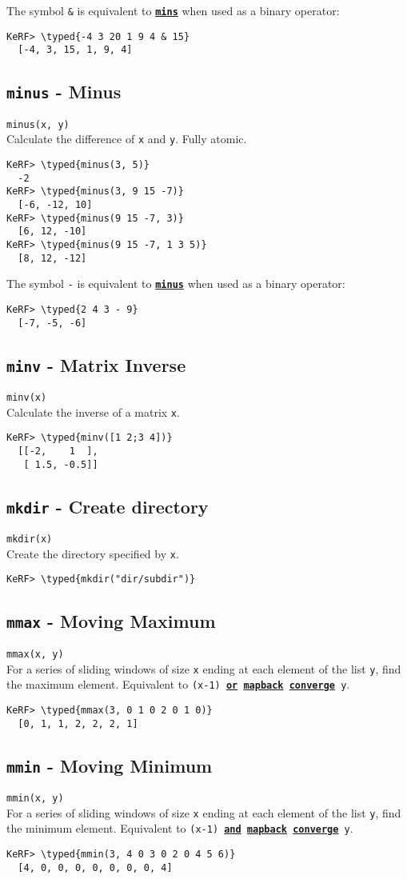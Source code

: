 \documentclass{article}
\newcommand{\typed}[1]{\textcolor{TealBlue}{#1}}
\newcommand{\primdefu}[3]{\subsection{\texttt{#1} - #2}\label{prim:#3}}
\newcommand{\primu}[2]{\hyperref[prim:#2]{\textbf{\texttt{#1}}}}
\newcommand{\primdef}[2]{\primdefu{#1}{#2}{#1}}
\newcommand{\prim}[1]{\primu{#1}{#1}}
\newcommand{\comb}[1]{\primu{#1}{#1}}
\begin{document}
The symbol \texttt{\&} is equivalent to \prim{mins} when used as a binary operator:
\begin{Verbatim}
KeRF> \typed{-4 3 20 1 9 4 & 15}
  [-4, 3, 15, 1, 9, 4]
\end{Verbatim}

\primdef{minus}{Minus}
\texttt{minus(x, y)}\\

Calculate the difference of \texttt{x} and \texttt{y}. Fully atomic.
\begin{Verbatim}
KeRF> \typed{minus(3, 5)}
  -2
KeRF> \typed{minus(3, 9 15 -7)}
  [-6, -12, 10]
KeRF> \typed{minus(9 15 -7, 3)}
  [6, 12, -10]
KeRF> \typed{minus(9 15 -7, 1 3 5)}
  [8, 12, -12]
\end{Verbatim}

The symbol \texttt{-} is equivalent to \prim{minus} when used as a binary operator:
\begin{Verbatim}
KeRF> \typed{2 4 3 - 9}
  [-7, -5, -6]
\end{Verbatim}

\primdef{minv}{Matrix Inverse}
\texttt{minv(x)}\\

Calculate the inverse of a matrix \texttt{x}.
\begin{Verbatim}
KeRF> \typed{minv([1 2;3 4])}
  [[-2,    1  ], 
   [ 1.5, -0.5]]
\end{Verbatim}

\primdef{mkdir}{Create directory}
\texttt{mkdir(x)}\\

Create the directory specified by \texttt{x}.
\begin{Verbatim}
KeRF> \typed{mkdir("dir/subdir")}
\end{Verbatim}

\primdef{mmax}{Moving Maximum}
\texttt{mmax(x, y)}\\

For a series of sliding windows of size \texttt{x} ending at each element of the list \texttt{y}, find the maximum element. Equivalent to \texttt{(x-1) \prim{or} \comb{mapback} \comb{converge} y}.
\begin{Verbatim}
KeRF> \typed{mmax(3, 0 1 0 2 0 1 0)}
  [0, 1, 1, 2, 2, 2, 1]
\end{Verbatim}

\primdef{mmin}{Moving Minimum}
\texttt{mmin(x, y)}\\

For a series of sliding windows of size \texttt{x} ending at each element of the list \texttt{y}, find the minimum element. Equivalent to \texttt{(x-1) \prim{and} \comb{mapback} \comb{converge} y}.
\begin{Verbatim}
KeRF> \typed{mmin(3, 4 0 3 0 2 0 4 5 6)}
  [4, 0, 0, 0, 0, 0, 0, 0, 4]
\end{Verbatim}
\end{document}
